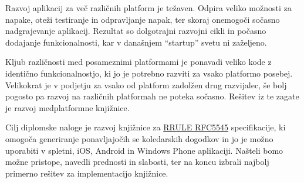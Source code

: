 








\begin{Povzetek}

Razvoj aplikacij za več različnih platform je težaven. Odpira veliko možnosti za napake, oteži testiranje in odpravljanje napak, ter skoraj onemogoči sočasno nadgrajevanje aplikacij. Rezultat so dolgotrajni razvojni cikli in počasno dodajanje funkcionalnosti, kar v današnjem ``startup'' svetu ni zaželjeno.

Kljub različnosti med posameznimi platformami je ponavadi veliko kode z identično funkcionalnostjo, ki jo je potrebno razviti za vsako platformo posebej. Velikokrat je v podjetju za vsako od platform zadolžen drug razvijalec, še bolj pogosto pa razvoj na različnih platformah ne poteka sočasno. Rešitev iz te zagate je razvoj medplatformne knjižnice.

Cilj diplomske naloge je razvoj knjižnice za \href{http://tools.ietf.org/html/rfc5545#section-3.3.10}{RRULE RFC5545} specifikacije, ki omogoča generiranje ponavljajočih se koledarskih dogodkov in jo je možno uporabiti v spletni, iOS, Android in Windows Phone aplikaciji. Našteli bomo možne pristope, navedli prednosti in slabosti, ter na koncu izbrali najbolj primerno rešitev za implementacijo knjižnice.
\end{Povzetek}









